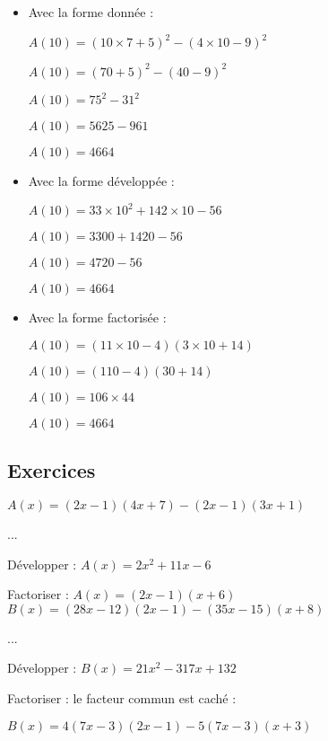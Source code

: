 \begin{itemize}
\item Avec la forme donnée :

$ A(10) = \left( 10\times7+5\right)^2 - \left(4\times 10-9\right)^2 $

$ A(10) = \left(70+5\right)^2 - \left(40-9\right)^2 $

$A(10) = 75^2 - 31^2 $

$A(10) = 5625 - 961 $

$A(10) = 4664 $ \\

\item Avec la forme développée : 

$ A(10) = 33 \times 10^2 + 142 \times 10 - 56 $

$A(10) = 3300 + 1420 - 56 $

$ A(10) = 4720 - 56 $

$ A(10) = 4664 $ \\

\item Avec la forme factorisée :

$ A(10) = \left(11\times 10 - 4\right)\left(3\times 10 + 14\right) $

$ A(10) =\left(110-4\right)\left(30 + 14\right) $

$ A(10) = 106 \times 44 $

$ A(10) = 4664 $
\end{itemize}

\newpage

\subsection{Exercices}

$ A(x) = \left(2x-1\right)\left(4x+7\right) - \left(2x-1\right)\left(3x+1\right) $ 

...

Développer : $ A(x) = 2x^2 + 11x -6 $ 

Factoriser : $ A(x) = \left(2x-1\right)\left(x+6\right) $ \\

$ B(x) = \left(28x-12\right)\left(2x-1\right)-\left(35x-15\right)\left(x+8\right) $ 

...  

Développer : $ B(x) =21x^2 - 317x + 132 $ 

Factoriser : le facteur commun est caché : 

$ B(x) = 4\left(7x-3\right)\left(2x-1\right)-5\left(7x-3\right)\left(x+3\right) $ 

